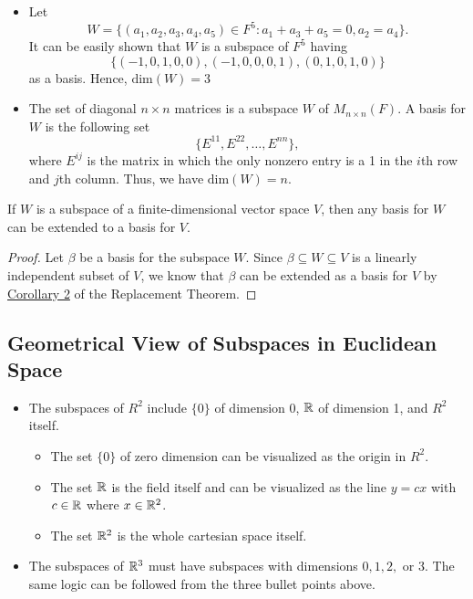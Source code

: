 \begin{eg}
    \begin{itemize}
        \item Let  
    \[  W = \{ (a_{1}, a_{2}, a_{3}, a_{4}, a_{5}) \in F^{5} : a_{1} + a_{3} + a_{5} = 0 , a_{2} = a_{4} \}. \]
    It can be easily shown that \( W  \) is a subspace of \( F^{5} \) having 
    \[  \{ (-1,0,1,0,0), (-1,0,0,0,1), (0,1,0,1,0) \}  \] as a basis. Hence, \( \text{dim}(W) = 3  \)
    \item The set of diagonal \( n \times n  \) matrices is a subspace \( W  \) of \( M_{n \times n}(F)  \). A basis for \( W  \) is the following set 
        \[  \{ E^{11} , E^{22} , \dots, E^{n n } \},  \]
        where \( E^{ij}  \) is the matrix in which the only nonzero entry is a 1 in the \( i \)th row and \( j \)th column. Thus, we have \( \text{dim}(W) = n  \).
    \end{itemize}
\end{eg}

\begin{corollary}\label{Corollary to Theorem 1.11}
    If \( W  \) is a subspace of a finite-dimensional vector space \( V  \), then any basis for \( W  \) can be extended to a basis for \( V  \).
\end{corollary}
\begin{proof}
Let \( \beta \) be a basis for the subspace \( W    \). Since \( \beta \subseteq W \subseteq V   \) is a linearly independent subset of \( V  \), we know that \( \beta \) can be extended as a basis for \( V  \) by {\hyperref[2nd Corollary to RT]{Corollary 2}} of the Replacement Theorem.
\end{proof}


\subsection{Geometrical View of Subspaces in Euclidean Space}

\begin{itemize}
    \item The subspaces of \( R^{2} \) include \( \{ 0 \}   \) of dimension 0, \( \mathbb{R}  \) of dimension 1, and \( R^{2} \) itself. 
        \begin{itemize}
            \item The set \(\{ 0 \}   \) of zero dimension can be visualized as the origin in \( R^{2} \).
            \item The set \( \mathbb{R} \) is the field itself and can be visualized as the line \( y = cx \) with \( c \in \mathbb{R}  \) where \( x \in \mathbb{R}^{2} \).
            \item The set \( \mathbb{R}^{2} \) is the whole cartesian space itself.
        \end{itemize}
    \item The subspaces of \( \mathbb{R}^{3} \) must have subspaces with dimensions \( 0, 1, 2,  \) or \( 3 \). The same logic can be followed from the three bullet points above.
\end{itemize}

